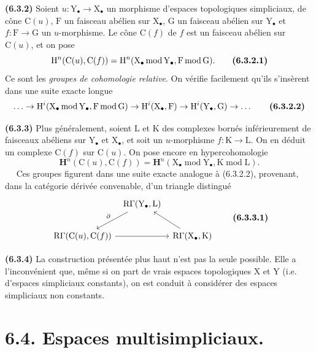 \documentclass[11pt,leqno]{article}
\newcommand{\Page}[1]{\ifvmode\noindent\else\unskip\ \fi{\footnotesize\textcolor{gray}{[p.\,#1]}}\ \ignorespaces}
\begin{document}
\textbf{(6.3.2)} Soient \(u:\mathrm{Y}_{\bullet}\to\mathrm{X}_{\bullet}\) un morphisme d’espaces topologiques simpliciaux, de cône \(\mathrm{C}(u)\), \(\mathrm{F}\) un faisceau abélien sur \(\mathrm{X}_{\bullet}\), \(\mathrm{G}\) un faisceau abélien sur \(\mathrm{Y}_{\bullet}\) et \(f:\mathrm{F}\to\mathrm{G}\) un \(u\)-morphisme. Le cône \(\mathrm{C}(f)\) de \(f\) est un faisceau abélien sur \(\mathrm{C}(u)\), et on pose
\[
\mathrm{H}^{n}(\mathrm{C}(u),\mathrm{C}(f))
=\mathrm{H}^{n}(\mathrm{X}_{\bullet}\operatorname{mod}\mathrm{Y}_{\bullet},
\mathrm{F}\operatorname{mod}\mathrm{G}).
\tag*{\textbf{(6.3.2.1)}}
\]
Ce sont les \textit{groupes de cohomologie relative}. On vérifie facilement qu’ils s’insèrent dans une suite exacte longue
\[
\ldots\to
\mathrm{H}^{i}(\mathrm{X}_{\bullet}\operatorname{mod}\mathrm{Y}_{\bullet},
\mathrm{F}\operatorname{mod}\mathrm{G})
\to\mathrm{H}^{i}(\mathrm{X}_{\bullet},\mathrm{F})
\to\mathrm{H}^{i}(\mathrm{Y}_{\bullet},\mathrm{G})
\to\ldots
\tag*{\textbf{(6.3.2.2)}}
\]

\textbf{(6.3.3)} Plus généralement, soient \(\mathrm{L}\) et \(\mathrm{K}\) des complexes bornés inférieurement de faisceaux abéliens sur \(\mathrm{Y}_{\bullet}\) et \(\mathrm{X}_{\bullet}\), et soit un \(u\)-morphisme \(f:\mathrm{K}\to\mathrm{L}\). On en déduit un complexe \(\mathrm{C}(f)\) sur \(\mathrm{C}(u)\). On pose encore en hypercohomologie
\[
\mathbf{H}^{n}(\mathrm{C}(u),\mathrm{C}(f))
=\mathbf{H}^{n}(\mathrm{X}_{\bullet}\operatorname{mod}\mathrm{Y}_{\bullet},
\mathrm{K}\operatorname{mod}\mathrm{L}).
\]
\Page{22}
Ces groupes figurent dans une suite exacte analogue à (6.3.2.2), provenant, dans la catégorie dérivée convenable, d’un triangle distingué
\[
\begin{tikzcd}[column sep=0.5em,row sep=2em]
& \mathrm{R}\Gamma(\mathrm{Y}_{\bullet},\mathrm{L})
  \arrow[dl,"\partial"'] & \\
\mathrm{R}\Gamma(\mathrm{C}(u),\mathrm{C}(f)) \arrow[rr]
& & \mathrm{R}\Gamma(\mathrm{X}_{\bullet},\mathrm{K}) \arrow[ul]
\end{tikzcd}
\tag*{\textbf{(6.3.3.1)}}
\]

\textbf{(6.3.4)} La construction présentée plus haut n’est pas la seule possible. Elle a l’inconvénient que, même si on part de vrais espaces topologiques \(\mathrm{X}\) et \(\mathrm{Y}\) (i.e. d’espaces simpliciaux constants), on est conduit à considérer des espaces simpliciaux non constants.

\section*{6.4. Espaces multisimpliciaux.}
\end{document}
